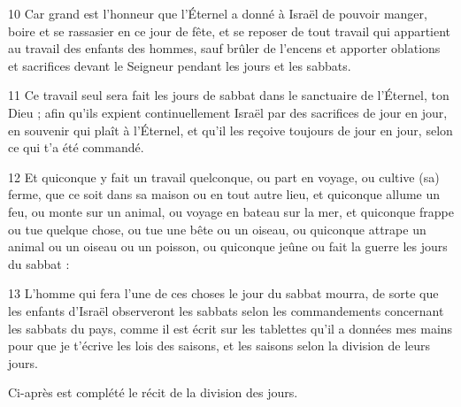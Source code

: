\par 10 Car grand est l'honneur que l'Éternel a donné à Israël de pouvoir manger, boire et se rassasier en ce jour de fête, et se reposer de tout travail qui appartient au travail des enfants des hommes, sauf brûler de l'encens et apporter oblations et sacrifices devant le Seigneur pendant les jours et les sabbats.
\par 11 Ce travail seul sera fait les jours de sabbat dans le sanctuaire de l'Éternel, ton Dieu ; afin qu'ils expient continuellement Israël par des sacrifices de jour en jour, en souvenir qui plaît à l'Éternel, et qu'il les reçoive toujours de jour en jour, selon ce qui t'a été commandé.
\par 12 Et quiconque y fait un travail quelconque, ou part en voyage, ou cultive (sa) ferme, que ce soit dans sa maison ou en tout autre lieu, et quiconque allume un feu, ou monte sur un animal, ou voyage en bateau sur la mer, et quiconque frappe ou tue quelque chose, ou tue une bête ou un oiseau, ou quiconque attrape un animal ou un oiseau ou un poisson, ou quiconque jeûne ou fait la guerre les jours du sabbat :
\par 13 L'homme qui fera l'une de ces choses le jour du sabbat mourra, de sorte que les enfants d'Israël observeront les sabbats selon les commandements concernant les sabbats du pays, comme il est écrit sur les tablettes qu'il a données mes mains pour que je t'écrive les lois des saisons, et les saisons selon la division de leurs jours.
\par    
\par     Ci-après est complété le récit de la division des jours.


